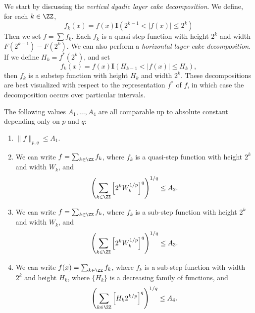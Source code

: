 We start by discussing the \emph{vertical dyadic layer cake decomposition}. We define, for each $k \in \ZZ$,
%
\[ f_k(x) = f(x) \mathbf{I}(2^{k-1} < |f(x)| \leq 2^k) \]
%
Then we set $f = \sum f_k$. Each $f_k$ is a quasi step function with height $2^k$ and width $F(2^{k-1}) - F(2^k)$. We can also perform a \emph{horizontal layer cake decomposition}. If we define $H_k = f^*(2^k)$, and set
%
\[ f_k(x) = f(x) \mathbf{I}(H_{k-1} < |f(x)| \leq H_k), \]
%
then $f_k$ is a substep function with height $H_k$ and width $2^k$. These decompositions are best visualized with respect to the representation $f^*$ of $f$, in which case the decomposition occurs over particular intervals.

\begin{theorem}
    The following values $A_1, \dots, A_4$ are all comparable up to absolute constant depending only on $p$ and $q$:
    \begin{enumerate}
        \item \label{onebound} $\| f \|_{p,q} \leq A_1$.

        \item \label{twobound} We can write $f = \sum_{k \in \ZZ} f_k$, where $f_k$ is a quasi-step function with height $2^k$ and width $W_k$, and
        \[ \left( \sum_{k \in \ZZ} \left[ 2^k W_k^{1/p} \right]^q \right)^{1/q} \leq A_2. \]

        \item \label{threebound} We can write $f = \sum_{k \in \ZZ} f_k$, where $f_k$ is a sub-step function with height $2^k$ and width $W_k$, and
        \[ \left( \sum_{k \in \ZZ} \left[2^{k} W_k^{1/p} \right]^q \right)^{1/q} \leq A_3. \]

        \item \label{fourbound} We can write $f(x) = \sum_{k \in \ZZ} f_k$, where $f_k$ is a sub-step function with width $2^k$ and height $H_k$, where $\{ H_k \}$ is a decreasing family of functions, and
        \[ \left( \sum_{k \in \ZZ} \left[H_k 2^{k/p} \right]^q \right)^{1/q} \leq A_4. \]
    \end{enumerate}
\end{theorem}
